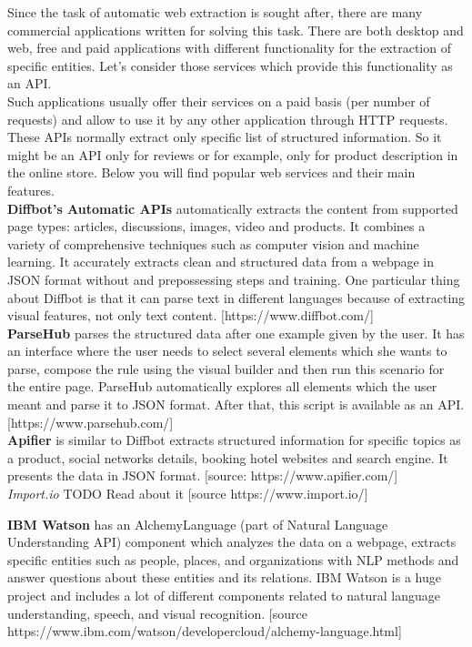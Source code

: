 Since the task of automatic web extraction is sought after, there are many commercial applications written for solving this task. There are both desktop and web, free and paid applications with different functionality for the extraction of specific entities. Let's consider those services which provide this functionality as an API.\\

Such applications usually offer their services on a paid basis (per number of requests) and allow to use it by any other application through HTTP requests. These APIs normally extract only specific list of structured information. So it might be an API only for reviews or for example, only for product description in the online store. Below you will find popular web services and their main features.\\

\noindent \textbf{Diffbot's Automatic APIs} automatically extracts the content from supported page types: articles, discussions, images, video and products. It combines a variety of comprehensive techniques such as computer vision and machine learning. It accurately extracts clean and structured data from a webpage in JSON format without and prepossessing steps and training. One particular thing about Diffbot is that it can parse text in different languages because of extracting visual features, not only text content. [https://www.diffbot.com/]\\

\noindent\textbf{ParseHub} parses the structured data after one example given by the user. It has an interface where the user needs to select several elements which she wants to parse, compose the rule using the visual builder and then run this scenario for the entire page. ParseHub automatically explores all elements which the user meant and parse it to JSON format. After that, this script is available as an API.    
[https://www.parsehub.com/]\\

\noindent\textbf{Apifier} is similar to Diffbot extracts structured information for specific topics as a product, social networks details, booking hotel websites and search engine. It presents the data in JSON format. 
[source: https://www.apifier.com/] \\

\noindent\textit{Import.io} TODO Read about it
[source https://www.import.io/]

\noindent \textbf{IBM Watson} has an AlchemyLanguage (part of Natural Language Understanding API) component which analyzes the data on a webpage, extracts specific entities such as people, places, and organizations with NLP methods and answer questions about these entities and its relations. IBM Watson is a huge project and includes a lot of different components related to natural language understanding, speech, and visual recognition.     
[source https://www.ibm.com/watson/developercloud/alchemy-language.html] \\

